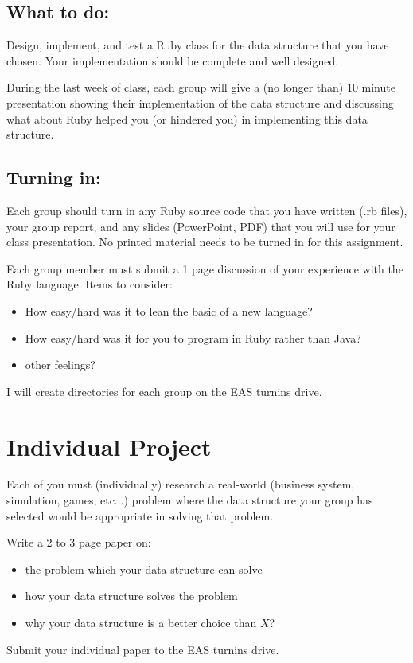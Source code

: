 \documentclass[11pt]{exam}
\begin{document}
\subsection{What to do:}
Design, implement, and test a Ruby class for the data structure that you have chosen.  Your implementation should be complete and well designed.
\par
During the last week of class, each group will give a (no longer than) 10 minute presentation showing their implementation of the data structure and discussing what about Ruby helped you (or hindered you) in implementing this data structure.   

\subsection{Turning in:}
Each group should turn in any Ruby source code that you have written (.rb files), your group report, and any slides (PowerPoint, PDF) that you will use for your class presentation.   No printed material needs to be turned in for this assignment.
\par
Each group member must submit a 1 page discussion of your experience with the Ruby language.   Items to consider:
\begin{itemize}
	\item How easy/hard was it to lean the basic of a new language?
	\item How easy/hard was it for you to program in Ruby rather than Java?
	\item other feelings?
\end{itemize}
\par
I will create directories for each group on the EAS turnins drive.

\section{Individual Project}
Each of you must (individually) research a real-world (business system, simulation, games, etc...) problem where the data structure your group has selected would be appropriate in solving that problem.  
\par
Write a 2 to 3 page paper on:
\begin{itemize}
	\item the problem which your data structure can solve
	\item how your data structure solves the problem
	\item why your data structure is a better choice than $X$?
\end{itemize}
\par
Submit your individual paper to the EAS turnins drive.
\end{document}
